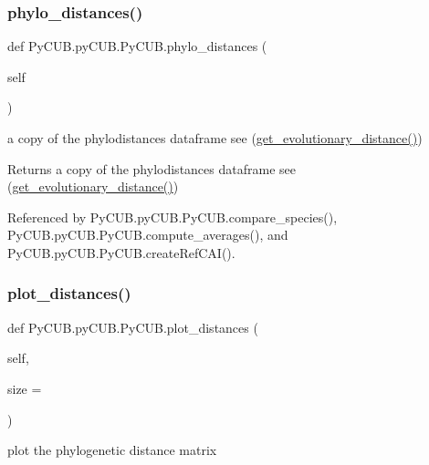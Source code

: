 \subsubsection{\texorpdfstring{phylo\+\_\+distances()}{phylo\_distances()}}
{\footnotesize\ttfamily def Py\+C\+U\+B.\+py\+C\+U\+B.\+Py\+C\+U\+B.\+phylo\+\_\+distances (\begin{DoxyParamCaption}\item[{}]{self }\end{DoxyParamCaption})}



a copy of the phylodistances dataframe see (\mbox{\hyperlink{class_py_c_u_b_1_1py_c_u_b_1_1_py_c_u_b_af0d7bed125f4437bea6b8051f9922c1d}{get\+\_\+evolutionary\+\_\+distance()}}) 

\begin{DoxyReturn}{Returns}
a copy of the phylodistances dataframe see (\mbox{\hyperlink{class_py_c_u_b_1_1py_c_u_b_1_1_py_c_u_b_af0d7bed125f4437bea6b8051f9922c1d}{get\+\_\+evolutionary\+\_\+distance()}}) 
\end{DoxyReturn}


Referenced by Py\+C\+U\+B.\+py\+C\+U\+B.\+Py\+C\+U\+B.\+compare\+\_\+species(), Py\+C\+U\+B.\+py\+C\+U\+B.\+Py\+C\+U\+B.\+compute\+\_\+averages(), and Py\+C\+U\+B.\+py\+C\+U\+B.\+Py\+C\+U\+B.\+create\+Ref\+C\+A\+I().

\mbox{\label{class_py_c_u_b_1_1py_c_u_b_1_1_py_c_u_b_a4e13b55153bbe774e9203818f2b7f690}} 
\subsubsection{\texorpdfstring{plot\+\_\+distances()}{plot\_distances()}}
{\footnotesize\ttfamily def Py\+C\+U\+B.\+py\+C\+U\+B.\+Py\+C\+U\+B.\+plot\+\_\+distances (\begin{DoxyParamCaption}\item[{}]{self,  }\item[{}]{size = {} }\end{DoxyParamCaption})}



plot the phylogenetic distance matrix 


